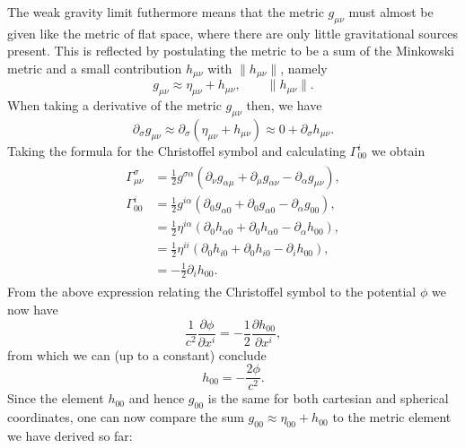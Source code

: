 \documentclass[a4paper,11pt]{article}
\numberwithin{equation}{section}
\begin{document}
{The weak gravity limit futhermore means that the metric $g_{\mu\nu}$ must almost be given like the metric of flat space, where there are only little gravitational sources present. This is reflected by postulating the metric to be a sum of the Minkowski metric and a small contribution $h_{\mu\nu}$ with $\|h_{\mu\nu}\|$, namely \begin{equation}
	g_{\mu\nu} \approx \eta_{\mu\nu} + h_{\mu\nu}, \qquad \|h_{\mu\nu}\|.
\end{equation} When taking a derivative of the metric $g_{\mu\nu}$ then, we have \begin{equation}
\partial_\sigma g_{\mu\nu} \approx \partial_\sigma (\eta_{\mu\nu} + h_{\mu\nu}) \approx 0 + \partial_\sigma h_{\mu\nu}.
\end{equation} Taking the formula for the Christoffel symbol and calculating $\Gamma^i_{00}$ we obtain \begin{align}
\begin{aligned}
	\Gamma^\sigma_{\mu\nu} &= \frac{1}{2}g^{\sigma\alpha}\left(\partial_\nu g_{\alpha\mu} + \partial_\mu g_{\alpha\nu} - \partial_\alpha g_{\mu\nu}\right), \\
	\Gamma_{00}^i &= \frac{1}{2}g^{i\alpha}\left(\partial_0 g_{\alpha 0} + \partial_0 g_{\alpha 0} - \partial_\alpha g_{00}\right), \\
	&= \frac{1}{2}\eta^{i\alpha}\left(\partial_0 h_{\alpha 0} + \partial_0 h_{\alpha 0} - \partial_\alpha h_{00}\right), \\
	&= \frac{1}{2}\eta^{ii}\left(\partial_0 h_{i0} + \partial_0 h_{i0} - \partial_i h_{00}\right), \\
	&= -\frac{1}{2}\partial_i h_{00}.
\end{aligned}
\end{align} From the above expression relating the Christoffel symbol to the potential $\phi$ we now have \begin{equation}
\frac{1}{c^2}\frac{\partial \phi}{\partial x^i} = -\frac{1}{2}\frac{\partial h_{00}}{\partial x^i},
\end{equation} from which we can (up to a constant) conclude \begin{equation}
h_{00} = -\frac{2\phi}{c^2}.
\end{equation} Since the element $h_{00}$ and hence $g_{00}$ is the same for both cartesian and spherical coordinates, one can now compare the sum $g_{00} \approx \eta_{00} + h_{00}$ to the metric element we have derived so far:
\begin{gather}\begin{gathered}

\end{gathered}
\end{gather}}
\end{document}

